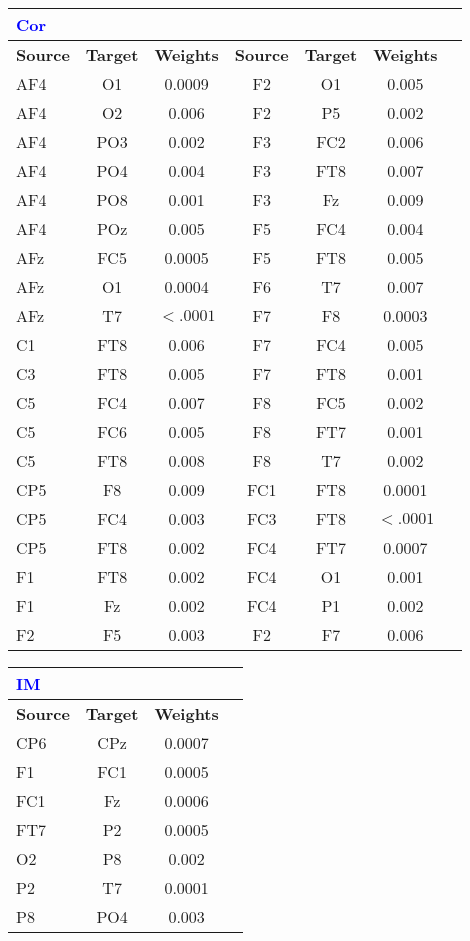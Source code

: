 \begin{table}[!t]
\begin{multicols}{2}
\begin{tabular}{|l|*{6}{c|}}
\hline
\textcolor{blue}{\textbf{Cor}} & & & & & \\
\hline
\textbf{Source} & \textbf{Target} & \textbf{Weights} & \textbf{Source} & \textbf{Target} & \textbf{Weights} \\
\hline
AF4 & O1 & 0.0009 & F2 & O1 & 0.005 \\
AF4 & O2 & 0.006 & F2 & P5 & 0.002 \\
AF4 & PO3 & 0.002 & F3 & FC2 & 0.006 \\
AF4 & PO4 & 0.004 & F3 & FT8 & 0.007 \\
AF4 & PO8 & 0.001 & F3 & Fz & 0.009 \\
AF4 & POz & 0.005 & F5 & FC4 & 0.004 \\
AFz & FC5 & 0.0005 & F5 & FT8 & 0.005 \\
AFz & O1 & 0.0004 & F6 & T7 & 0.007 \\
AFz & T7 & $<.0001$ & F7 & F8 & 0.0003 \\
C1 & FT8 & 0.006 & F7 & FC4 & 0.005 \\
C3 & FT8 & 0.005 & F7 & FT8 & 0.001 \\
C5 & FC4 & 0.007 & F8 & FC5 & 0.002 \\
C5 & FC6 & 0.005 & F8 & FT7 & 0.001 \\
C5 & FT8 & 0.008 & F8 & T7 & 0.002 \\
CP5 & F8 & 0.009 & FC1 & FT8 & 0.0001 \\
CP5 & FC4 & 0.003 & FC3 & FT8 & $<.0001$ \\
CP5 & FT8 & 0.002 & FC4 & FT7 & 0.0007 \\
F1 & FT8 & 0.002 & FC4 & O1 & 0.001 \\
F1 & Fz & 0.002 & FC4 & P1 & 0.002 \\
F2 & F5 & 0.003 & F2 & F7 & 0.006 \\
\hline
\end{tabular}
\end{multicols}

\begin{multicols}{2}
\scriptsize
\begin{tabular}{|l|*{3}{c|}}
\hline
\textcolor{blue}{\textbf{IM}} & & \\
\hline
\textbf{Source} & \textbf{Target} & \textbf{Weights} \\
\hline
CP6 & CPz & 0.0007 \\
F1 & FC1 & 0.0005 \\
FC1 & Fz & 0.0006 \\
FT7 & P2 & 0.0005 \\
O2 & P8 & 0.002 \\
P2 & T7 & 0.0001 \\
P8 & PO4 & 0.003 \\
\hline
\end{tabular}


\end{multicols}
\end{table}
